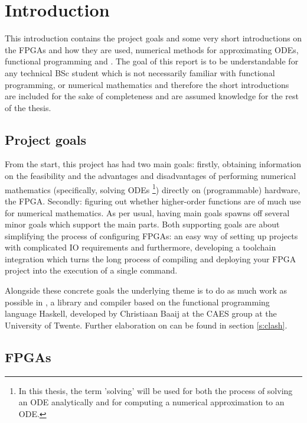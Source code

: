 \chapter{Introduction} 
This introduction contains the project goals and some very short introductions on the FPGAs and how they are used, numerical methods for approximating ODEs, functional programming and \clash{}. The goal of this report is to be understandable for any technical BSc student which is not necessarily familiar with functional programming, or numerical mathematics and therefore the short introductions are included for the sake of completeness and are assumed knowledge for the rest of the thesis. 

\section{Project goals}
From the start, this project has had two main goals: firstly, obtaining information on the feasibility and the advantages and disadvantages of performing numerical mathematics (specifically, solving ODEs \footnote{In this thesis, the term 'solving' will be used for both the process of solving an ODE analytically and for computing a numerical approximation to an ODE.}) directly on (programmable) hardware, the FPGA. Secondly: figuring out whether higher-order functions are of much use for numerical mathematics. As per usual, having main goals spawns off several minor goals which support the main parts. Both supporting goals are about simplifying the process of configuring FPGAs: an easy way of setting up projects with complicated IO requirements and furthermore, developing a toolchain integration which turns the long process of compiling and deploying your FPGA project into the execution of a single command.

Alongside these concrete goals the underlying theme is to do as much work as possible in \clash{}, a library and compiler based on the functional programming language Haskell, developed by Christiaan Baaij at the CAES group at the University of Twente. Further elaboration on \clash{} can be found in section \ref{s:clash}.


\section{FPGAs}

